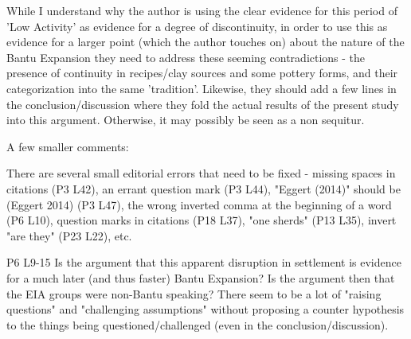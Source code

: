 \begin{reviewer}
\point While I understand why the author is using the clear evidence for this period of 'Low Activity' as evidence for a degree of discontinuity, in order to use this as evidence for a larger point (which the author touches on) about the nature of the Bantu Expansion they need to address these seeming contradictions - the presence of continuity in recipes/clay sources and some pottery forms, and their categorization into the same 'tradition'. Likewise, they should add a few lines in the conclusion/discussion where they fold the actual results of the present study into this argument. Otherwise, it may possibly be seen as a non sequitur. 


\noindent A few smaller comments:

\point There are several small editorial errors that need to be fixed - missing spaces in citations (P3 L42), an errant question mark (P3 L44), "Eggert (2014)" should be (Eggert 2014) (P3 L47), the wrong inverted comma at the beginning of a word (P6 L10), question marks in citations (P18 L37), "one sherds" (P13 L35), invert "are they" (P23 L22), etc.


\point P6 L9-15 Is the argument that this apparent disruption in settlement is evidence for a much later (and thus faster) Bantu Expansion? Is the argument then that the EIA groups were non-Bantu speaking? There seem to be a lot of "raising questions" and "challenging assumptions" without proposing a counter hypothesis to the things being questioned/challenged (even in the conclusion/discussion).


\end{reviewer}

